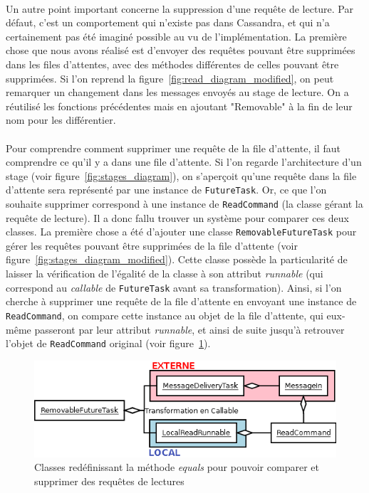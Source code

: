 \documentclass[12pt]{article}
\newcommand{\class}[1]{\texttt{#1}}
\begin{document}
\paragraph{}Un autre point important concerne la suppression d'une requête de lecture. Par défaut, c'est un comportement qui n'existe pas dans Cassandra, et qui n'a certainement pas été imaginé possible au vu de l'implémentation. La première chose que nous avons réalisé est d'envoyer des requêtes pouvant être supprimées dans les files d'attentes, avec des méthodes différentes de celles pouvant être supprimées. Si l'on reprend la figure~\ref{fig:read_diagram_modified}, on peut remarquer un changement dans les messages envoyés au stage de lecture. On a réutilisé les fonctions précédentes mais en ajoutant "Removable" à la fin de leur nom pour les différentier.

\paragraph{}Pour comprendre comment supprimer une requête de la file d'attente, il faut comprendre ce qu'il y a dans une file d'attente. Si l'on regarde l'architecture d'un stage (voir figure~\ref{fig:stages_diagram}), on s'aperçoit qu'une requête dans la file d'attente sera représenté par une instance de \class{FutureTask}. Or, ce que l'on souhaite supprimer correspond à une instance de \class{ReadCommand} (la classe gérant la requête de lecture). Il a donc fallu trouver un système pour comparer ces deux classes. La première chose a été d'ajouter une classe \class{RemovableFutureTask} pour gérer les requêtes pouvant être supprimées de la file d'attente (voir figure~\ref{fig:stages_diagram_modified}). Cette classe possède la particularité de laisser la vérification de l'égalité de la classe à son attribut \textit{runnable} (qui correspond au \textit{callable} de \class{FutureTask} avant sa transformation). Ainsi, si l'on cherche à supprimer une requête de la file d'attente en envoyant une instance de \class{ReadCommand}, on compare cette instance au objet de la file d'attente, qui eux-même passeront par leur attribut \textit{runnable}, et ainsi de suite jusqu'à retrouver l'objet de \class{ReadCommand} original (voir figure~\ref{fig:remove_request_diagram}).

\begin{figure}[!h]
	\centering
        \includegraphics[width=13cm]{images/implementation/remove_request_diagram.png}
    \caption{Classes redéfinissant la méthode \textit{equals} pour pouvoir comparer et supprimer des requêtes de lectures \label{fig:remove_request_diagram}}
\end{figure}
\end{document}
